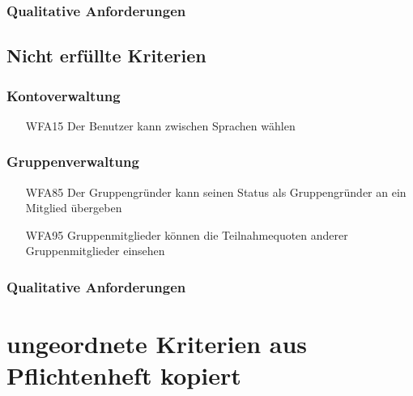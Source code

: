 \documentclass{scrartcl}
\begin{document}
	\subsubsection{Qualitative Anforderungen}
	
	\newpage
	\subsection{Nicht erfüllte Kriterien}
		\subsubsection{Kontoverwaltung}
		\begin{itemize}
			\item[WFA15] Der Benutzer kann zwischen Sprachen wählen
		\end{itemize}
		
		\subsubsection{Gruppenverwaltung}
			\begin{itemize}
			
			\item[WFA85] Der Gruppengründer kann seinen Status als Gruppengründer an ein Mitglied übergeben

			
			\item[WFA95] Gruppenmitglieder können die Teilnahmequoten anderer Gruppenmitglieder einsehen
			\end{itemize}

	\subsubsection{Qualitative Anforderungen}
	
	\newpage
		
	\section{ungeordnete Kriterien aus Pflichtenheft kopiert}
		
			
			
		
		
\end{document}
